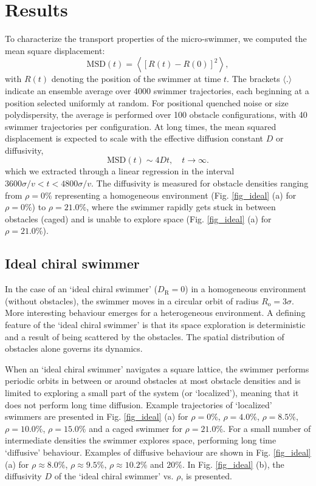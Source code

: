 \documentclass[aps,pre,twocolumn,showpacs,superscriptaddress,amsmath,amssymb,longbibliography]{revtex4-2}
\begin{document}
\section{Results}
To characterize the transport properties of the micro-swimmer, we computed the mean square displacement:
\begin{equation}
    \text{MSD}(t) = 
\left\langle [R(t) - R(0) ]^2 \right\rangle,
\end{equation}
with $R(t)$ denoting the position of the swimmer at time $t$. The brackets $\langle . \rangle$ indicate an ensemble average over 4000 swimmer trajectories, each beginning at a position selected uniformly at random. For positional quenched noise or size polydispersity, the average is performed over 100 obstacle configurations, with 40 swimmer trajectories per configuration. 
At long times, the mean squared displacement is expected to scale with the effective diffusion constant $D$ or diffusivity,
\begin{equation}
   \text{MSD} (t) \sim 4Dt,  \quad t \rightarrow \infty.
\end{equation}
which we extracted through a linear regression in the interval $3600\sigma/v < t < 4800\sigma/v$.
The diffusivity is measured for obstacle densities ranging from $\rho=0 \%$ representing a homogeneous environment (Fig. \ref{fig_ideal} (a) for $\rho=0 \%$) to $\rho=21.0\%$, where the swimmer rapidly gets stuck in between obstacles (caged) and is unable to explore space (Fig. \ref{fig_ideal} (a) for $\rho = 21.0 \%$).
\subsection{Ideal chiral swimmer} 
In the case of an `ideal chiral swimmer' ($D_{\textrm{R}} = 0$) in a homogeneous environment (without obstacles), the swimmer moves in a circular orbit of radius $R_{\textrm{o}} =3\sigma$. More interesting behaviour emerges for a heterogeneous environment. A defining feature of the `ideal chiral swimmer' is that its space exploration is deterministic and a result of being scattered by the obstacles. The spatial distribution of obstacles alone governs its dynamics. 

When an `ideal chiral swimmer' navigates a square lattice, the swimmer performs periodic orbits in between or around obstacles at most obstacle densities and is limited to exploring a small part of the system (or `localized'), meaning that it does not perform long time diffusion. Example trajectories of `localized' swimmers are presented in Fig. \ref{fig_ideal} (a) for $\rho = 0\%$, $\rho = 4.0\%$, $\rho = 8.5\%$, $\rho = 10.0\%$, $\rho = 15.0\%$ and a caged swimmer for $\rho = 21.0\%$. For a small number of intermediate densities the swimmer explores space, performing long time `diffusive' behaviour. Examples of diffusive behaviour are shown in Fig. \ref{fig_ideal} (a) for $\rho \approx 8.0\%$, $\rho \approx 9.5 \%$, $\rho \approx 10.2\%$ and $20 \%$. In Fig. \ref{fig_ideal} (b), the diffusivity $D$ of the `ideal chiral swimmer' vs. $\rho $, is presented.   
\end{document}
